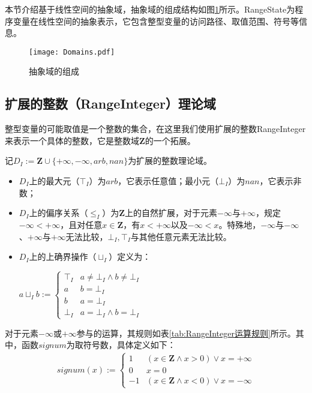 本节介绍基于线性空间的抽象域，抽象域的组成结构如图\ref{fig:Domains}所示。RangeState为程序变量在线性空间的抽象表示，它包含整型变量的访问路径、取值范围、符号等信息。

\begin{figure}[H]
	\centering
	\texttt{[image: Domains.pdf]}
	\caption{抽象域的组成}
	\label{fig:Domains}
\end{figure}

\subsection{扩展的整数（RangeInteger）理论域}
\label{sec:Integer}

整型变量的可能取值是一个整数的集合，在这里我们使用扩展的整数RangeInteger来表示一个具体的整数，它是整数域$ \mathbf{Z} $的一个拓展。

\begin{definition}
	记$ D_I := \mathbf{Z} \cup \{ +\infty, -\infty, arb, nan\}  $为扩展的整数理论域。
	\begin{itemize}
		\item $ D_I $上的最大元（$ \top_I $）为$ arb $，它表示任意值；最小元（$ \bot_I $）为$ nan $，它表示非数；
		
		\item $ D_I $上的偏序关系（$ \le_I $）为$ \mathbf{Z} $上的自然扩展，对于元素$ -\infty $与$ +\infty $，规定$ -\infty < +\infty $，且对任意$ x \in \mathbf{Z} $，有$ x < +\infty $以及$ -\infty < x $。特殊地，$ -\infty $与$ -\infty $、$ +\infty $与$ +\infty $无法比较，$ \bot_I, \top_I $与其他任意元素无法比较。
		
		\item $ D_I $上的上确界操作（$ \sqcup_I $）定义为：\\
		\centerline{$ a \sqcup_I b := \begin{cases}
			\top_I & a \ne \bot_I \land b \ne \bot_I\\
			a & b = \bot_I\\
			b & a = \bot_I\\
			\bot_I & a = \bot_I \land b = \bot_I
			\end{cases} $}
	\end{itemize}
\end{definition}

对于元素$ -\infty $或$ +\infty $参与的运算，其规则如表\ref{tab:RangeInteger运算规则}所示。其中，函数$ signum $为取符号数，具体定义如下：
\begin{align}
	signum(x) := \begin{cases}
		1 & (x \in \mathbf{Z} \land x > 0) \lor x = +\infty\\
		0 & x = 0\\
		-1 & (x \in \mathbf{Z} \land x < 0) \lor x = -\infty
	\end{cases}
\end{align}

